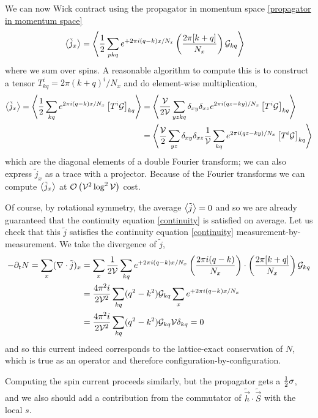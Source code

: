 We can now Wick contract using the propagator in momentum space \eqref{propagator in momentum space}
\begin{align}
	\left\langle \tilde{j}_x \right\rangle
	&=
	\left\langle 
		\frac{1}{2} \sum_{pkq} e^{+2\pi i (q-k)x / N_x} \left(\frac{2\pi [ k+q ]}{N_x}\right)
		\mathcal{G}_{kq}
		 \right\rangle
\end{align}
where we sum over spins.
A reasonable algorithm to compute this is to construct a tensor $T_{kq}^i = 2\pi(k+q)^i/N_x$ and do element-wise multiplication,
\begin{align}
	\left\langle \tilde{j}_x \right\rangle
	=
	\left\langle 
		\frac{1}{2} \sum_{kq} e^{2\pi i(q-k) x / N_x} \left[ T^i \mathcal{G}\right]_{kq}
	 \right\rangle
	&=
	\left\langle 
		\frac{\mathcal{V}}{2\mathcal{V}} \sum_{yzkq} \delta_{xy}\delta_{xz} e^{2\pi i(qz-ky) / N_x} \left[ T^i \mathcal{G}\right]_{kq}
	 \right\rangle
	\nonumber\\
	&=
	\left\langle 
		\frac{\mathcal{V}}{2} \sum_{yz} \delta_{xy} \delta_{xz} \frac{1}{\mathcal{V}}\sum_{kq} e^{2\pi i(qz-ky) / N_x} \left[ T^i \mathcal{G}\right]_{kq}
	 \right\rangle
\end{align}
which are the diagonal elements of a double Fourier transform; we can also express $\tilde{j}_x$ as a trace with a projector.
Because of the Fourier transforms we can compute $\left\langle \tilde{j}_x \right\rangle$ at $\mathcal{O}\left(\mathcal{V}^2 \log^2 \mathcal{V}\right)$ cost.

Of course, by rotational symmetry, the average $\left\langle \tilde{j} \right\rangle=0$ and so we are already guaranteed that the continuity equation \eqref{continuity} is satisfied on average.
Let us check that this $\tilde{j}$ satisfies the continuity equation \eqref{continuity} measurement-by-measurement.
We take the divergence of $\tilde{j}$,
\begin{align}
	-\partial_t N = \sum_x (\nabla\cdot \tilde{j})_x
	&=
	\sum_x \frac{1}{2\mathcal{V}} \sum_{kq} e^{+2\pi i (q-k) x / N_x} \left(\frac{2\pi i(q-k)}{N_x}\right) \cdot \left(\frac{2\pi [ k+q ]}{N_x}\right)
		\mathcal{G}_{kq}
	\nonumber\\
	&=
	\frac{4\pi^2i}{2\mathcal{V}^2} \sum_{kq}  (q^2-k^2)
		\mathcal{G}_{kq} \sum_x e^{+2\pi i (q-k) x / N_x}
	\nonumber\\
	&=
	\frac{4\pi^2i}{2\mathcal{V}^2} \sum_{kq}  (q^2-k^2)
		\mathcal{G}_{kq} \mathcal{V} \delta_{kq} = 0
\end{align}
and so this current indeed corresponds to the lattice-exact conservation of $N$, which is true as an operator and therefore configuration-by-configuration.

Computing the spin current proceeds similarly, but the propagator gets a $\frac{1}{2} \sigma$, and we also should add a contribution from the commutator of $\tilde{\vec{h}}\cdot\tilde{\vec{S}}$ with the local $s$.

